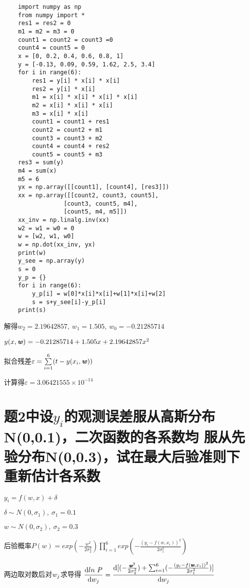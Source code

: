 \documentclass[UTF8]{ctexart}
\begin{document}
\begin{lstlisting}
    import numpy as np
    from numpy import *
    res1 = res2 = 0
    m1 = m2 = m3 = 0
    count1 = count2 = count3 =0
    count4 = count5 = 0
    x = [0, 0.2, 0.4, 0.6, 0.8, 1]
    y = [-0.13, 0.09, 0.59, 1.62, 2.5, 3.4]
    for i in range(6):
        res1 = y[i] * x[i] * x[i]
        res2 = y[i] * x[i]
        m1 = x[i] * x[i] * x[i] * x[i]
        m2 = x[i] * x[i] * x[i]
        m3 = x[i] * x[i]
        count1 = count1 + res1
        count2 = count2 + m1
        count3 = count3 + m2
        count4 = count4 + res2
        count5 = count5 + m3
    res3 = sum(y)
    m4 = sum(x)
    m5 = 6
    yx = np.array([[count1], [count4], [res3]])
    xx = np.array([[count2, count3, count5], 
                 [count3, count5, m4], 
                 [count5, m4, m5]])
    xx_inv = np.linalg.inv(xx)
    w2 = w1 = w0 = 0
    w = [w2, w1, w0]
    w = np.dot(xx_inv, yx)
    print(w)
    y_see = np.array(y)
    s = 0
    y_p = {}
    for i in range(6):
        y_p[i] = w[0]*x[i]*x[i]+w[1]*x[i]+w[2]
        s = s+y_see[i]-y_p[i]
    print(s)
\end{lstlisting}

解得$w_{2}=2.19642857,\ w_{1}=1.505,\ w_{0}=-0.21285714$

$y(x,\textbf{\emph{w}})=-0.21285714+1.505x+2.19642857x^2$

拟合残差$\varepsilon =\sum\limits_{i=1}\limits^6 (t-y(x_{i},\textbf{\emph{w}}))$

计算得$\varepsilon=3.06421555×10^{-14}$

\section{题2中设$y_{i}$的观测误差服从高斯分布N(0,0.1)，二次函数的各系数均
  服从先验分布N(0,0.3)，试在最大后验准则下重新估计各系数}
$y_{i}=f(w,x)+\delta$

$\delta  \sim N(0,\sigma _{1}),\ \sigma _{1}=0.1$

$w \sim N(0,\sigma _{2}),\ \sigma _{2}=0.3$

后验概率$\displaystyle{P(w)=exp(-\frac{w^2}{2\sigma _{2}^2})\prod_{i=1}^6 exp(-\frac{(y_{i}-f(w,x_{i}))^2}{2\sigma _{1}^2})}$

两边取对数后对$\emph{$w_{j}$}$求导得
$\displaystyle{\frac{\text{d}ln\ P}{\text{d}\emph{$w_{j}$}}
  =\frac{\text{d}[(-\frac{\pmb{\emph{w}}^2}{2\sigma _{2}^2})+
  \sum_{i=1}^6 (-\frac{(y_{i}-f(\pmb{\emph{w}},x_{i}))^2}{2\sigma _{1}^2})]}
  {\text{d}\emph{$w_{j}$}}}$
\end{document}
